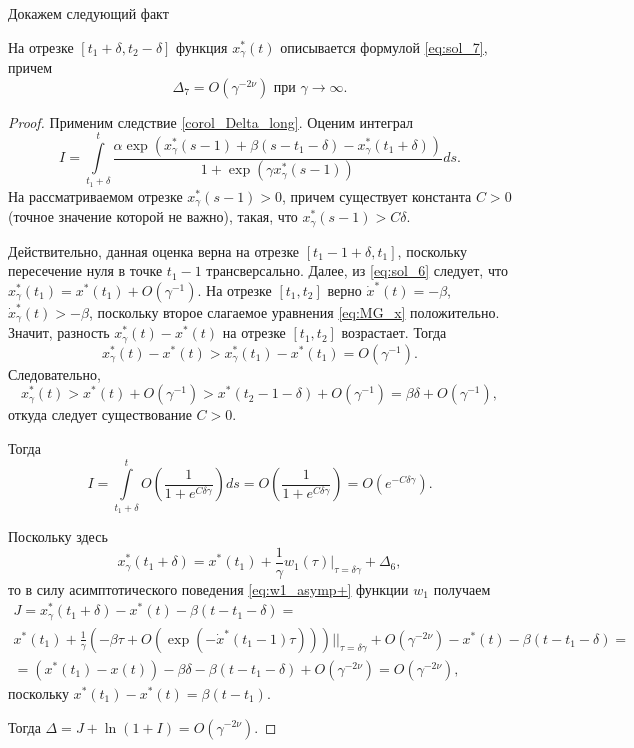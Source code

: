 Докажем следующий факт
\begin{lemma}
\label{lm:Delta_7}
На отрезке $[t_1 + \delta, t_2 - \delta]$ функция $x_\gamma^*(t)$ описывается формулой \eqref{eq:sol_7}, причем
\[
\Delta_7 = O(\gamma^{- 2\nu})\text{ при }\gamma\to\infty.
\]
\end{lemma}
\begin{proof}
Применим следствие \ref{corol_Delta_long}.
Оценим интеграл
%
\begin{equation*}
	I = \int \limits_{t_1+\delta}^{t}\frac{\alpha\exp(x_\gamma^*(s - 1) + \beta(s - t_1 - \delta) - x_\gamma^*(t_1 + \delta))}{1  +\exp(\gamma x_\gamma^*(s - 1))}ds.
\end{equation*}
%
На рассматриваемом отрезке $x_\gamma^*(s - 1) > 0$, причем существует константа $C > 0$ (точное значение которой не важно), такая, что $x_\gamma^*(s-1) > C\delta.$

Действительно, данная оценка верна на отрезке $[t_1 - 1 + \delta, t_1]$, поскольку пересечение нуля в точке $t_1 - 1$ трансверсально. Далее, из \eqref{eq:sol_6} следует, что $x^*_{\gamma}(t_1) = x^*(t_1) + O(\gamma^{-1})$. На отрезке $[t_1, t_2]$ верно $\dot{x}^*(t) = -\beta$, $\dot{x}^*_\gamma(t) > -\beta$, поскольку второе слагаемое уравнения \eqref{eq:MG_x} положительно. Значит, разность $x^*_{\gamma}(t) - x^*(t)$ на отрезке $[t_1, t_2]$ возрастает. Тогда
%
\[
x^*_{\gamma}(t) - x^*(t) > x^*_{\gamma}(t_1) - x^*(t_1) = O(\gamma^{-1}).
\]
%
Следовательно,
%
\[
x^*_{\gamma}(t) > x^*(t) + O(\gamma^{-1}) > x^*(t_2 - 1 - \delta) + O(\gamma^{-1}) = \beta\delta + O(\gamma^{-1}),
\]
откуда следует существование $C > 0$.
	
Тогда
\begin{equation}
	\label{I_step7}
	I = \int\limits_{t_1+\delta}^{t} O\left(\frac{1}{1 + e^{C \delta \gamma}}\right) ds = O\left(\frac{1}{1 + e^{C \delta \gamma}}\right) = O(e^{-C\delta\gamma}).
\end{equation}

Поскольку здесь
\[
x_\gamma^*(t_1+\delta) = x^*(t_1) + \frac{1}{\gamma} w_1(\tau)\bigg\vert_{\tau=\delta\gamma} + \Delta_6,
\]
то в силу асимптотического поведения \eqref{eq:w1_asymp+} функции $w_1$ получаем
\begin{multline*}
	J = x_\gamma^*(t_1 + \delta) - x^*(t) - \beta(t - t_1 - \delta) =\\
	x^*(t_1) + \frac{1}{\gamma} (-\beta\tau + O(\exp(-\dot{x}^*(t_1 - 1) \tau)))\bigg\vert|_{\tau = \delta\gamma} + O(\gamma^{-2\nu}) - x^*(t) - \beta(t - t_1 - \delta) =\\
	= (x^*(t_1) - x(t)) - \beta \delta - \beta(t - t_1 - \delta) + O(\gamma^{-2\nu}) = O(\gamma^{-2\nu}),
\end{multline*}
поскольку $x^*(t_1) - x^*(t) = \beta (t - t_1)$.

Тогда $\Delta = J + \ln(1 + I) = O(\gamma^{-2\nu})$.
	
\end{proof}

